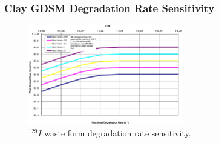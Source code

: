 \begin{frame}[ctb!]
\frametitle{Clay GDSM Degradation Rate Sensitivity}

\begin{figure}[ht!]
\centering
\includegraphics[width=0.6\textwidth]{./nuclide_demonstration/DegRate/I-129.eps}
\caption{$^{129}I$ waste form degradation rate sensitivity.}
\label{fig:WFDegI129}
\end{figure}
\end{frame}
